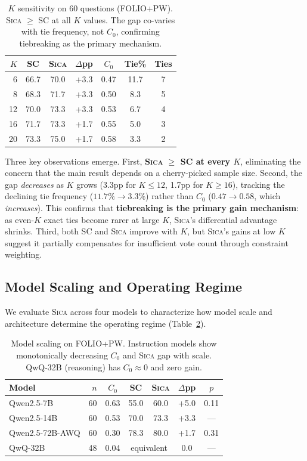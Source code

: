 \documentclass[11pt,a4paper]{article}
\newcommand{\sica}{\textsc{Sica}}
\begin{document}
\begin{table}[t]
\centering
\small
\begin{tabular}{rcccccc}
\toprule
$K$ & \textbf{SC} & \textbf{\sica{}} & $\Delta$\textbf{pp} & $C_0$ & \textbf{Tie\%} & \textbf{Ties} \\
\midrule
6 & 66.7 & 70.0 & +3.3 & 0.47 & 11.7 & 7 \\
8 & 68.3 & 71.7 & +3.3 & 0.50 & 8.3 & 5 \\
12 & 70.0 & 73.3 & +3.3 & 0.53 & 6.7 & 4 \\
16 & 71.7 & 73.3 & +1.7 & 0.55 & 5.0 & 3 \\
20 & 73.3 & 75.0 & +1.7 & 0.58 & 3.3 & 2 \\
\bottomrule
\end{tabular}
\caption{$K$ sensitivity on 60 questions (FOLIO+PW). \sica{} $\geq$ SC at all $K$ values. The gap co-varies with tie frequency, not $C_0$, confirming tiebreaking as the primary mechanism.}
\label{tab:k_ablation}
\end{table}

Three key observations emerge.
First, \textbf{\sica{} $\geq$ SC at every $K$}, eliminating the concern that the main result depends on a cherry-picked sample size.
Second, the gap \emph{decreases} as $K$ grows (3.3pp for $K \leq 12$, 1.7pp for $K \geq 16$), tracking the declining tie frequency ($11.7\% \to 3.3\%$) rather than $C_0$ ($0.47 \to 0.58$, which \emph{increases}).
This confirms that \textbf{tiebreaking is the primary gain mechanism}: as even-$K$ exact ties become rarer at large $K$, \sica{}'s differential advantage shrinks.
Third, both SC and \sica{} improve with $K$, but \sica{}'s gains at low $K$ suggest it partially compensates for insufficient vote count through constraint weighting.

\subsection{Model Scaling and Operating Regime}
\label{sec:scaling}

We evaluate \sica{} across four models to characterize how model scale and architecture determine the operating regime (Table~\ref{tab:scaling}).

\begin{table}[t]
\centering
\small
\begin{tabular}{lrccccc}
\toprule
\textbf{Model} & $n$ & $C_0$ & \textbf{SC} & \textbf{\sica{}} & $\Delta$\textbf{pp} & $p$ \\
\midrule
Qwen2.5-7B & 60 & 0.63 & 55.0 & 60.0 & +5.0 & 0.11 \\
Qwen2.5-14B & 60 & 0.53 & 70.0 & 73.3 & +3.3 & --- \\
Qwen2.5-72B-AWQ & 60 & 0.30 & 78.3 & 80.0 & +1.7 & 0.31 \\
QwQ-32B & 48 & 0.04 & \multicolumn{2}{c}{equivalent} & 0.0 & --- \\
\bottomrule
\end{tabular}
\caption{Model scaling on FOLIO+PW. Instruction models show monotonically decreasing $C_0$ and \sica{} gap with scale. QwQ-32B (reasoning) has $C_0 \approx 0$ and zero gain.}
\label{tab:scaling}
\end{table}
\end{document}
